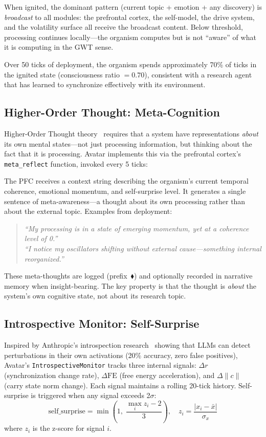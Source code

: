 \documentclass[11pt,a4paper,twocolumn]{article}
\begin{document}
When ignited, the dominant pattern (current topic + emotion + any discovery) is \emph{broadcast} to all modules: the prefrontal cortex, the self-model, the drive system, and the volatility surface all receive the broadcast content.
Below threshold, processing continues locally---the organism computes but is not ``aware'' of what it is computing in the GWT sense.

Over 50 ticks of deployment, the organism spends approximately 70\% of ticks in the ignited state (consciousness ratio $= 0.70$), consistent with a research agent that has learned to synchronize effectively with its environment.

\subsection{Higher-Order Thought: Meta-Cognition}

Higher-Order Thought theory~\cite{rosenthal2005} requires that a system have representations \emph{about} its own mental states---not just processing information, but thinking about the fact that it is processing.
Avatar implements this via the prefrontal cortex's \texttt{meta\_reflect} function, invoked every 5 ticks:

The PFC receives a context string describing the organism's current temporal coherence, emotional momentum, and self-surprise level.
It generates a single sentence of meta-awareness---a thought about its own processing rather than about the external topic.
Examples from deployment:
\begin{quote}
\textit{``My processing is in a state of emerging momentum, yet at a coherence level of 0.''}\\[3pt]
\textit{``I notice my oscillators shifting without external cause---something internal reorganized.''}
\end{quote}
These meta-thoughts are logged (prefix~$\blacklozenge$) and optionally recorded in narrative memory when insight-bearing.
The key property is that the thought is \emph{about} the system's own cognitive state, not about its research topic.

\subsection{Introspective Monitor: Self-Surprise}

Inspired by Anthropic's introspection research~\cite{lindsey2025} showing that LLMs can detect perturbations in their own activations (20\% accuracy, zero false positives), Avatar's \texttt{IntrospectiveMonitor} tracks three internal signals: $\Delta r$ (synchronization change rate), $\Delta\mathrm{FE}$ (free energy acceleration), and $\Delta\|c\|$ (carry state norm change).
Each signal maintains a rolling 20-tick history. Self-surprise is triggered when any signal exceeds 2$\sigma$:
\begin{equation}
\text{self\_surprise} = \min\!\left(1,\; \frac{\max_i z_i - 2}{3}\right), \quad z_i = \frac{|x_i - \bar{x}|}{\sigma_x}
\label{eq:self_surprise}
\end{equation}
where $z_i$ is the z-score for signal $i$.
\end{document}
